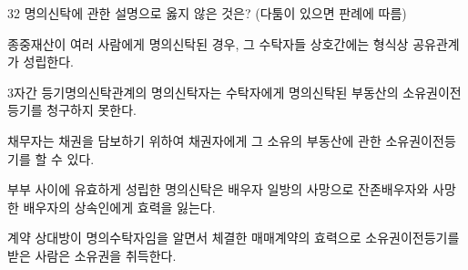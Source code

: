 \begin{question}{32}
명의신탁에 관한 설명으로 옳지 않은 것은? (다툼이 있으면 판례에 따름)
\begin{choices}
  \item 종중재산이 여러 사람에게 명의신탁된 경우, 그 수탁자들 상호간에는 형식상 공유관계가 성립한다.
  \item 3자간 등기명의신탁관계의 명의신탁자는 수탁자에게 명의신탁된 부동산의 소유권이전등기를 청구하지 못한다.
  \item 채무자는 채권을 담보하기 위하여 채권자에게 그 소유의 부동산에 관한 소유권이전등기를 할 수 있다.
  \item 부부 사이에 유효하게 성립한 명의신탁은 배우자 일방의 사망으로 잔존배우자와 사망한 배우자의 상속인에게 효력을 잃는다.
  \item 계약 상대방이 명의수탁자임을 알면서 체결한 매매계약의 효력으로 소유권이전등기를 받은 사람은 소유권을 취득한다.
\end{choices}
\end{question}
